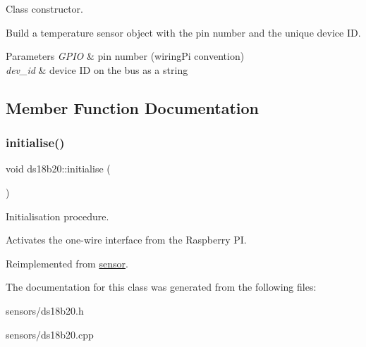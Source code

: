Class constructor. 

Build a temperature sensor object with the pin number and the unique device ID. 
\begin{DoxyParams}{Parameters}
{\em G\+P\+IO} & pin number (wiring\+Pi convention) \\
\hline
{\em dev\+\_\+id} & device ID on the bus as a string \\
\hline
\end{DoxyParams}


\subsection{Member Function Documentation}
\mbox{\label{classds18b20_a222d770b98aa7c0d6ae27da9756c8979}} 
\subsubsection{\texorpdfstring{initialise()}{initialise()}}
{\footnotesize\ttfamily void ds18b20\+::initialise (\begin{DoxyParamCaption}{ }\end{DoxyParamCaption})\hspace{0.3cm}{\ttfamily [virtual]}}



Initialisation procedure. 

Activates the one-\/wire interface from the Raspberry PI. 

Reimplemented from \mbox{\hyperlink{classsensor_ae1073389f46dd119e2f421a894b7d781}{sensor}}.



The documentation for this class was generated from the following files\+:\begin{DoxyCompactItemize}
\item 
sensors/ds18b20.\+h\item 
sensors/ds18b20.\+cpp\end{DoxyCompactItemize}
